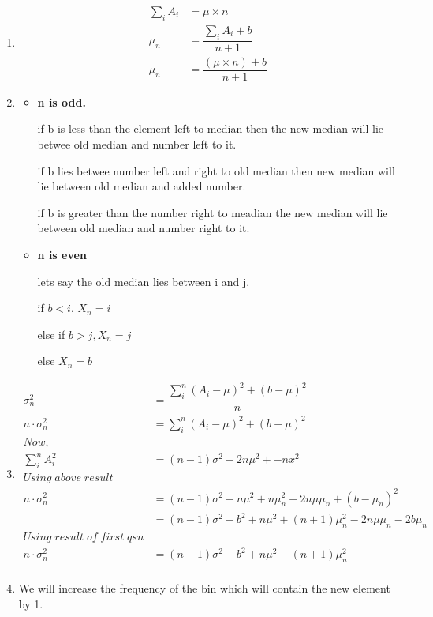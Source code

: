 \documentclass{article}
\theoremstyle{remark}
\begin{document}
\begin{enumerate}
    \item
          \begin{align*}
              \sum_iA_i & =\mu\times n                    \\
              \mu_n     & =\dfrac{\sum_iA_i+b}{n+1}       \\
              \mu_n     & = \dfrac{(\mu \times n)+b}{n+1}
          \end{align*}

    \item \begin{itemize}
              \item \textbf{n is odd.} \par
                    if b is less than the element left to median then the new median will lie betwee old median and number left to it. \par
                    if b lies betwee number left and right to old median then new median will lie between old median and added number.\par
                    if b is greater than the number right to meadian the new median will lie between old median and number right to it.
              \item \textbf{n is even}\par
                    lets say the old median lies between i and j.\par
                    if $b < i$, $X_n=i$ \par
                    else if $ b > j, X_n=j$ \par
                    else $X_n=b$
          \end{itemize}
    \item \begin{align*}
              \sigma_n^2       & =\dfrac{\sum_i^n(A_i-\mu)^2 + (b-\mu)^2}{n}               \\
              n\cdot\sigma_n^2 & =\sum_i^n(A_i-\mu)^2 + (b-\mu)^2                          \\
              Now,                                                                         \\
              \sum_i^nA_i^2    & =(n-1)\sigma^2+2n\mu^2+-nx^2                              \\
              Using\; above \; result                                                      \\
              n\cdot\sigma^2_n & =(n-1)\sigma^2+n\mu^2+n\mu_n^2-2n\mu\mu_n+(b-\mu_n)^2     \\
                               & =(n-1)\sigma^2+b^2+n\mu^2+(n+1)\mu_n^2-2n\mu\mu_n-2b\mu_n \\
              Using\; result \; of \; first\; qsn                                          \\
              n\cdot\sigma_n^2 & =(n-1)\sigma^2+b^2+n\mu^2-(n+1)\mu_n^2                    \\
          \end{align*}
    \item We will increase the frequency of the bin which will contain the new element by 1.
\end{enumerate}
\end{document}
